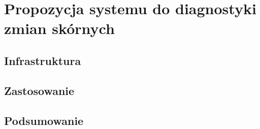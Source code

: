
\def\filename{rozdzial3}
\chapter{Propozycja systemu do diagnostyki zmian skórnych}

\section{Infrastruktura}

\section{Zastosowanie}

\section{Podsumowanie}